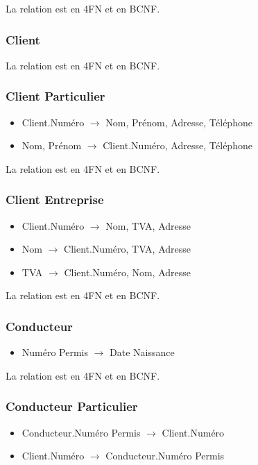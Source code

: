 \documentclass[a4paper]{article}
\newenvironment{changemargin}[2]{%
\begin{list}{}{%
\setlength{\topsep}{0pt}%
\setlength{\leftmargin}{#1}%
\setlength{\rightmargin}{#2}%
\setlength{\listparindent}{\parindent}%
\setlength{\itemindent}{\parindent}%
\setlength{\parsep}{\parskip}%
}%
\item[]}{\end{list}}
\begin{document}
\begin{changemargin}{-1cm}{-1cm}
    La relation est en 4FN et en BCNF.

    \subsubsection{Client}

    La relation est en 4FN et en BCNF.

    \subsubsection{Client Particulier}
    \begin{itemize}
        \item Client.Numéro $\rightarrow$ Nom, Prénom, Adresse, Téléphone
        \item Nom, Prénom $\rightarrow$ Client.Numéro, Adresse, Téléphone
    \end{itemize}

    La relation est en 4FN et en BCNF.

    \subsubsection{Client Entreprise}
    \begin{itemize}
        \item Client.Numéro $\rightarrow$ Nom, TVA, Adresse
        \item Nom $\rightarrow$ Client.Numéro, TVA, Adresse
        \item TVA $\rightarrow$ Client.Numéro, Nom, Adresse
    \end{itemize}

    La relation est en 4FN et en BCNF.

    \subsubsection{Conducteur}
    \begin{itemize}
        \item Numéro Permis $\rightarrow$ Date Naissance
    \end{itemize}

    La relation est en 4FN et en BCNF.

    \subsubsection{Conducteur Particulier}
    \begin{itemize}
        \item Conducteur.Numéro Permis $\rightarrow$ Client.Numéro
        \item Client.Numéro $\rightarrow$ Conducteur.Numéro Permis
    \end{itemize}


\end{changemargin}
\end{document}
